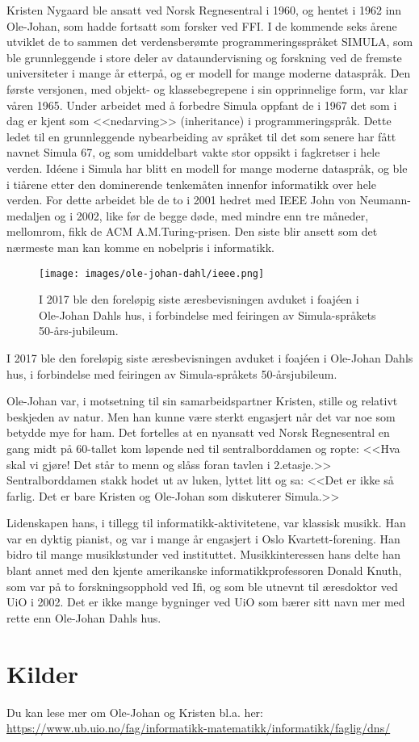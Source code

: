 Kristen Nygaard ble ansatt ved Norsk Regnesentral i 1960, og hentet i 1962 inn Ole-Johan, som hadde fortsatt som forsker ved FFI. I de kommende seks årene utviklet de to sammen det verdensberømte programmeringsspråket SIMULA, som ble grunnleggende i store deler av dataundervisning og forskning ved de fremste universiteter i mange år etterpå, og er modell for mange moderne dataspråk. Den første versjonen, med objekt- og klassebegrepene i sin opprinnelige form, var klar våren 1965. Under arbeidet med å forbedre Simula oppfant de i 1967 det som i dag er kjent som <<nedarving>> (inheritance) i programmeringspråk. Dette ledet til en grunnleggende nybearbeiding av språket til det som senere har fått navnet Simula 67, og som umiddelbart vakte stor oppsikt i fagkretser i hele verden. Idéene i Simula har blitt en modell for mange moderne dataspråk, og ble i tiårene etter den dominerende tenkemåten innenfor informatikk over hele verden. For dette arbeidet ble de to i 2001 hedret med IEEE John von Neumann-medaljen og i 2002, like før de begge døde, med mindre enn tre måneder, mellomrom, fikk de ACM A.M.Turing-prisen. Den siste blir ansett som det nærmeste man kan komme en nobelpris i informatikk.

\begin{figure}
	\texttt{[image: images/ole-johan-dahl/ieee.png]}
	\label{fig:ieee}
	\caption{I 2017 ble den foreløpig siste æresbevisningen avduket i foajéen i Ole-Johan Dahls hus, i forbindelse med feiringen av Simula-språkets 50-års-jubileum.}
\end{figure}

I 2017 ble den foreløpig siste æresbevisningen avduket i foajéen i Ole-Johan Dahls hus, i forbindelse med feiringen av Simula-språkets 50-årsjubileum.

Ole-Johan var, i motsetning til sin samarbeidspartner Kristen, stille og relativt beskjeden av natur. Men han kunne være sterkt engasjert når det var noe som betydde mye for ham. Det fortelles at en nyansatt ved Norsk Regnesentral en gang midt på 60-tallet kom løpende ned til sentralborddamen og ropte: <<Hva skal vi gjøre! Det står to menn og slåss foran tavlen i 2.etasje.>> Sentralborddamen stakk hodet ut av luken, lyttet litt og sa: <<Det er ikke så farlig. Det er bare Kristen og Ole-Johan som diskuterer Simula.>>

Lidenskapen hans, i tillegg til informatikk-aktivitetene, var klassisk musikk. Han var en dyktig pianist, og var i mange år engasjert i Oslo Kvartett-forening. Han bidro til mange musikkstunder ved instituttet. Musikkinteressen hans delte han blant annet med den kjente amerikanske informatikkprofessoren Donald Knuth, som var på to forskningsopphold ved Ifi, og som ble utnevnt til æresdoktor ved UiO i 2002.
Det er ikke mange bygninger ved UiO som bærer sitt navn mer med rette enn Ole-Johan Dahls hus.

\section*{Kilder}

Du kan lese mer om Ole-Johan og Kristen bl.a. her: \url{https://www.ub.uio.no/fag/informatikk-matematikk/informatikk/faglig/dns/}

